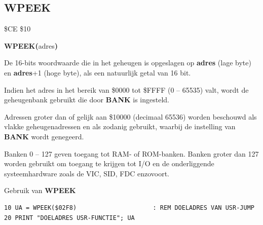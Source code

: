
\newpage
\subsection{WPEEK}
\begin{description}[leftmargin=2cm,style=nextline]
\item [Token:]    \$CE \$10

\item [Formaat:]   {\bf WPEEK(}adres{\bf)}

\item [Retourneert:]  De 16-bits woordwaarde die in het geheugen is opgeslagen op {\bf adres} (lage byte) en {\bf adres}+1 (hoge byte), als een natuurlijk getal van 16 bit.

Indien het adres in het bereik van \$0000 tot \$FFFF (0 -- 65535) valt, wordt de geheugenbank gebruikt die door {\bf BANK} is ingesteld.

                  Adressen groter dan of gelijk aan \$10000 (decimaal 65536) worden beschouwd als vlakke geheugenadressen en als zodanig gebruikt, waarbij de instelling van {\bf BANK} wordt genegeerd.

\item [Opmerkingen:]  Banken 0 -- 127 geven toegang tot RAM- of ROM-banken. Banken groter dan 127 worden gebruikt om toegang te krijgen tot I/O en de onderliggende systeemhardware zoals de VIC, SID, FDC enzovoort.

\item [Voorbeeld:]  Gebruik van {\bf WPEEK}

\begin{tcolorbox}[colback=black,coltext=white]
\verbatimfont{\codefont}
\begin{verbatim}
10 UA = WPEEK($02F8)                     : REM DOELADRES VAN USR-JUMP
20 PRINT "DOELADRES USR-FUNCTIE"; UA
\end{verbatim}
\end{tcolorbox}
\end{description}


\newpage
